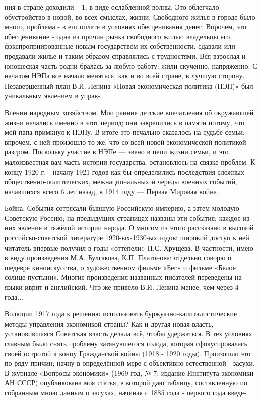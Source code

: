 ния в стране доходили +1. в виде ослабленной волны. Это облегчало обустройство в новой, во всех смыслах, жизни. Свободного жилья в городе было много, проблема - в его оплате в условиях обесценивания денег. Впрочем, это обесценивание - одна из причин рынка свободного жилья: владельцы его, фэкспроприированные новым государством их собственности, сдавали или продавали жилье и таким образом справлялись с трудностями. Вся взрослая и юношеская часть родни бралась за любую работу: жили скученно, напряженно. С началом НЭПа все начало меняться, как и во всей стране, в лучшую сторону. Незавершенный план В.И. Ленина «Новая экономическая политика (НЭП)» был уникальным явлением в управ-

Влении народным хозяйством. Мои ранние детские впечатления об окружающей жизни начались именно в этот период; они закрепились в памяти потому, что мой папа примкнул к НЭПу. В итоге это печально сказалось на судьбе семьи; впрочем, с ней произошло то же, что со всей новой экономической политикой — разгром. Поскольку участие в НЭПе — звено в цепи жизни семьи, и это малоизвестная вам часть истории государства, остановлюсь на связке проблем. К концу 1920 г. - началу 1921 годов как бы определились последствия сложных общественно-политических, межнациональных и череды военных событий, начавшихся всего 6 лет назад, в 1914 году — Первая Мировая война.

Бойна. События сотрясали бывшую Российскую империю, а затем молодую Советскую Россию; на предыдущих страницах названы эти события; каждое из них явление в тяжёлой истории народа. О многом из этого рассказано в высокой российско-советской литературе 1920-ых-1930-ых годов; широкий доступ к ней читатель впервые получил в годы «оттепели» Н.С. Хрущёва. В частности, имею в виду произведения М.А. Булгакова, К.П. Платонова: отдельно говорю о шедевре киноискусства, о художественном фильме «Бег» и фильме «Белое солнце пустыни». Многие произведения названных писателей переведены на языки иврит и английский. Что же привело В.И. Ленина менее, чем через 4 года...

Волюции 1917 года к решению использовать буржуазно-капиталистические методы управления экономикой страны? Как и другая новая власть, установившаяся Советская власть делала всё, чтобы удержаться. В тех условиях главным было снять проблему затянувшегося голода, которая сфокусировалась своей остротой к концу Гражданской войны (1918 - 1920 годы). Произошло это по ряду причин; начну в определённой мере с объективно-естественной - засухи. В журнале «Вопросы экономики» (1969 год, № 7; издание Института экономики АН СССР) опубликована моя статья, в которой даю таблицу, составленную по собранным мною данным о засухах, начиная с 1885 года - первого года введе-

